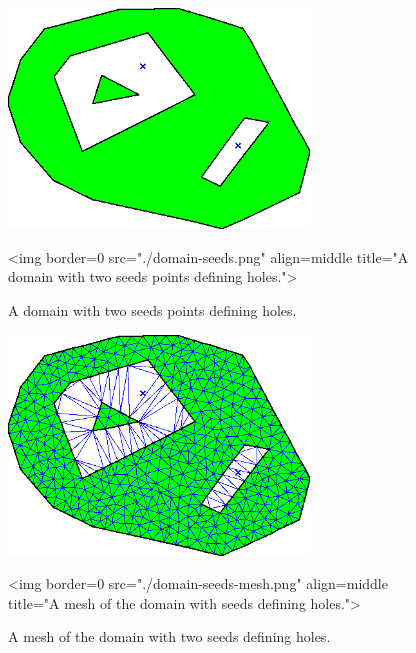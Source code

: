 \begin{figure}[htbp]
\begin{center}
\begin{ccTexOnly}
\includegraphics[width=8cm]{Mesh_2/domain-seeds}
\end{ccTexOnly}
\begin{ccHtmlOnly}
<img border=0 src="./domain-seeds.png"
     align=middle title="A domain with two seeds points defining holes.">
\end{ccHtmlOnly}
\end{center}
\caption{A domain with two seeds points defining holes.}
\label{Domain-seeds}
\end{figure}

\begin{figure}[htbp]
\begin{center}
\begin{ccTexOnly}
\includegraphics[width=8cm]{Mesh_2/domain-seeds-mesh}
\end{ccTexOnly}
\begin{ccHtmlOnly}
<img border=0 src="./domain-seeds-mesh.png"
     align=middle title="A mesh of the domain with seeds defining holes.">
\end{ccHtmlOnly}
\end{center}
\caption{A mesh of the domain with two seeds defining holes.}
\label{Domain-seeds-mesh}
\end{figure}

